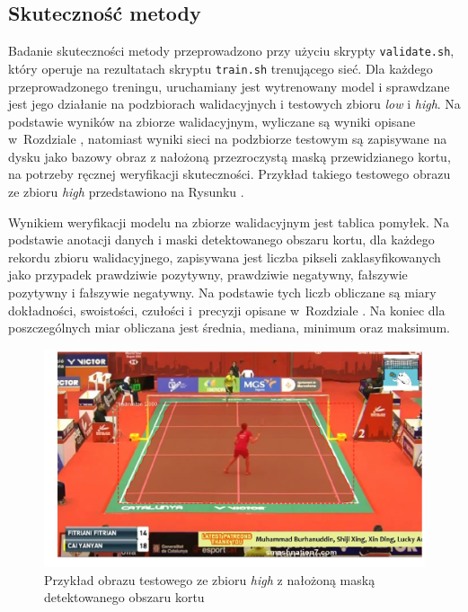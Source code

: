 \subsection*{Skuteczność metody}

Badanie skuteczności metody przeprowadzono przy użyciu skrypty \texttt{validate.sh}, który operuje na rezultatach skryptu \texttt{train.sh} trenującego sieć.
Dla każdego przeprowadzonego treningu, uruchamiany jest wytrenowany model i sprawdzane jest jego działanie na podzbiorach walidacyjnych i testowych zbioru \textit{low} i \textit{high}. Na podstawie wyników na zbiorze walidacyjnym, wyliczane są wyniki opisane w~Rozdziale , natomiast wyniki sieci na podzbiorze testowym są zapisywane na dysku jako bazowy obraz z nałożoną przezroczystą maską przewidzianego kortu, na potrzeby ręcznej weryfikacji skuteczności. Przykład takiego testowego obrazu
ze zbioru \textit{high} przedstawiono na Rysunku .


Wynikiem weryfikacji modelu na zbiorze walidacyjnym jest tablica pomyłek. Na podstawie anotacji danych i maski detektowanego obszaru kortu, dla każdego rekordu zbioru walidacyjnego, zapisywana jest liczba pikseli zaklasyfikowanych jako przypadek prawdziwie pozytywny, prawdziwie negatywny, fałszywie pozytywny i fałszywie negatywny. Na podstawie tych liczb obliczane są miary dokładności, swoistości, czułości i~precyzji opisane w~Rozdziale . Na koniec dla poszczególnych miar obliczana jest średnia, mediana, minimum oraz maksimum.

\begin{figure}[!htb]
  \includegraphics[width=\linewidth]{./ss2.jpg}
    \caption{Przykład obrazu testowego ze zbioru \textit{high} z nałożoną maską detektowanego obszaru kortu}
    \label{fig:testexample}
\end{figure}
